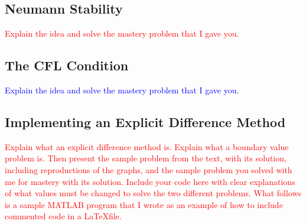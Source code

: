 \documentclass{article}
\newcommand{\red}[1]{\textcolor{red}{#1}}
\newcommand{\blue}[1]{\textcolor{blue}{#1}}
\begin{document}
\subsection{Neumann Stability}
\red{Explain the idea and solve the mastery problem that I gave you.}

 \subsection{The CFL Condition}
\blue{Explain the idea and solve the mastery problem that I gave you.}
 
\subsection{Implementing an Explicit Difference Method}
\red{Explain what an explicit difference method is. Explain what a boundary value problem is. Then present the sample problem from the text, with its solution, including reproductions of the graphs, and the sample problem you solved with me for mastery with its solution. Include your code here with clear explanations of what values must be changed to solve the two different problems. What follows is a sample MATLAB program that I wrote as an example of how to include commented code in a \LaTeX file.}
\end{document}
